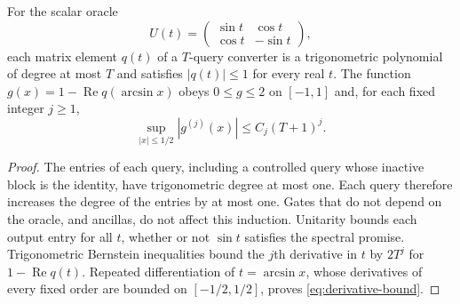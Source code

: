 \begin{lemma}\label{lem:scalar}
For the scalar oracle
\begin{equation}\label{eq:scalar-oracle}
 U(t)=\begin{pmatrix}\sin t&\cos t\\\cos t&-\sin t\end{pmatrix},
\end{equation}
each matrix element $q(t)$ of a $T$-query converter is a trigonometric polynomial of degree at most $T$ and satisfies $|q(t)|\leq1$ for every real $t$. The function $g(x)=1-\operatorname{Re}q(\arcsin x)$ obeys $0\leq g\leq2$ on $[-1,1]$ and, for each fixed integer $j\geq1$,
\begin{equation}\label{eq:derivative-bound}
 \sup_{|x|\leq1/2}|g^{(j)}(x)|\leq C_j(T+1)^j.
\end{equation}
\end{lemma}
\begin{proof}
The entries of each query, including a controlled query whose inactive block is the identity, have trigonometric degree at most one. Each query therefore increases the degree of the entries by at most one. Gates that do not depend on the oracle, and ancillas, do not affect this induction. Unitarity bounds each output entry for all $t$, whether or not $\sin t$ satisfies the spectral promise. Trigonometric Bernstein inequalities bound the $j$th derivative in $t$ by $2T^j$ for $1-\operatorname{Re}q(t)$. Repeated differentiation of $t=\arcsin x$, whose derivatives of every fixed order are bounded on $[-1/2,1/2]$, proves \eqref{eq:derivative-bound}.
\end{proof}
